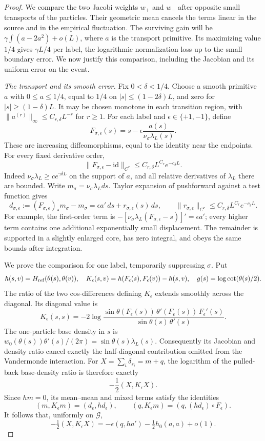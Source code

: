 \begin{proof}
We compare the two Jacobi weights \(w_+\) and \(w_-\) after opposite small transports of the particles. Their geometric mean cancels the terms linear in the source and in the empirical fluctuation. The surviving gain will be
\(\gamma\int(a-2a^2)+o(L)\), where \(a\) is the transport primitive. Its maximizing value \(1/4\) gives \(\gamma L/4\) per label, the logarithmic normalization loss up to the small boundary error. We now justify this comparison, including the Jacobian and its uniform error on the event.

\emph{The transport and its smooth error.}
Fix \(0<\delta<1/4\). Choose a smooth primitive \(a\) with
\(0\le a\le1/4\), equal to \(1/4\) on
\(|s|\le(1-2\delta)L\), and zero for \(|s|\ge(1-\delta)L\).
It may be chosen monotone in each transition region, with
\(\|a^{(r)}\|_\infty\le C_{r,\delta}L^{-r}\) for \(r\ge1\).
For each label and \(\epsilon\in\{+1,-1\}\), define
\[
 F_{\sigma,\epsilon}(s)
   =s-\epsilon\frac{a(s)}{\nu_\sigma\lambda_L(s)}.
\]
These are increasing diffeomorphisms, equal to the identity near the
endpoints. For every fixed derivative order,
\[
 \|F_{\sigma,\epsilon}-\mathrm{id}\|_{C^r}
      \le C_{r,\delta}L^{C_r}e^{-c_\delta L}.
\]
Indeed \(\nu_\sigma\lambda_L\ge c e^{\gamma\delta L}\) on the
support of \(a\), and all relative derivatives of \(\lambda_L\)
there are bounded. Write \(m_\sigma=\nu_\sigma\lambda_Lds\).
Taylor expansion of pushforward against a test function gives
\[
 d_{\sigma,\epsilon}:=(F_{\sigma,\epsilon})_*m_\sigma-m_\sigma
       =\epsilon a'\,ds+r_{\sigma,\epsilon}(s)\,ds,
 \qquad
 \|r_{\sigma,\epsilon}\|_{C^r}
       \le C_{r,\delta}L^{C_r}e^{-c_\delta L}.
\]
For example, the first-order term is
\(-[\nu_\sigma\lambda_L(F_{\sigma,\epsilon}-s)]'
=\epsilon a'\); every higher term contains one additional exponentially
small displacement. The remainder is supported in a slightly enlarged
core, has zero integral, and obeys the same bounds after integration.

We prove the comparison for one label, temporarily suppressing
\(\sigma\). Put
\[
 h(s,v)=H_{\rm ref}(\theta(s),\theta(v)),\quad
 K_\epsilon(s,v)=h(F_\epsilon(s),F_\epsilon(v))-h(s,v),\quad
 g(s)=\log\cot(\theta(s)/2).
\]
The ratio of the two cos-differences defining \(K_\epsilon\) extends
smoothly across the diagonal. Its diagonal value is
\[
 K_\epsilon(s,s)
  =-2\log\frac{\sin\theta(F_\epsilon(s))\,
             \theta'(F_\epsilon(s))\,F_\epsilon'(s)}
            {\sin\theta(s)\,\theta'(s)}.
\]
The one-particle base density in \(s\) is
\(w_0(\theta(s))\theta'(s)/(2\pi)
  =\sin\theta(s)\lambda_L(s)\).
Consequently its Jacobian and density ratio cancel exactly the
half-diagonal contribution omitted from the Vandermonde interaction.
For \(X=\sum_i\delta_{s_i}=m+q\), the logarithm of the pulled-back
base-density ratio is therefore exactly
\[
 -\frac12(X,K_\epsilon X).
\]
Since \(hm=0\), its mean--mean and mixed terms satisfy the identities
\[
 (m,K_\epsilon m)=(d_\epsilon,hd_\epsilon),\qquad
 (q,K_\epsilon m)=(q,(hd_\epsilon)\circ F_\epsilon).
\]
It follows that, uniformly on \(\mathcal G\),
\[
 -\tfrac12(X,K_\epsilon X)
       =-\epsilon(q,ha')-\tfrac12h_0(a,a)+o(1).
\]


\end{proof}
